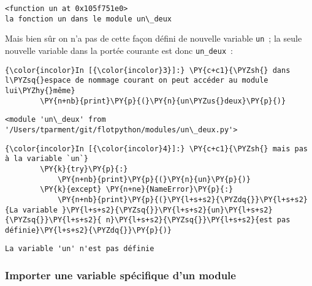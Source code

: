     \begin{Verbatim}[commandchars=\\\{\},frame=single,framerule=0.3mm,rulecolor=\color{cellframecolor}]
<function un at 0x105f751e0>
la fonction un dans le module un\_deux
\end{Verbatim}

    Mais bien sûr on n'a pas de cette façon défini de nouvelle variable
\texttt{un}~; la seule nouvelle variable dans la portée courante est
donc \texttt{un\_deux}~:

    \begin{Verbatim}[commandchars=\\\{\},frame=single,framerule=0.3mm,rulecolor=\color{cellframecolor}]
{\color{incolor}In [{\color{incolor}3}]:} \PY{c+c1}{\PYZsh{} dans l\PYZsq{}espace de nommage courant on peut accéder au module lui\PYZhy{}même}
        \PY{n+nb}{print}\PY{p}{(}\PY{n}{un\PYZus{}deux}\PY{p}{)}
\end{Verbatim}


    \begin{Verbatim}[commandchars=\\\{\},frame=single,framerule=0.3mm,rulecolor=\color{cellframecolor}]
<module 'un\_deux' from '/Users/tparment/git/flotpython/modules/un\_deux.py'>
\end{Verbatim}

    \begin{Verbatim}[commandchars=\\\{\},frame=single,framerule=0.3mm,rulecolor=\color{cellframecolor}]
{\color{incolor}In [{\color{incolor}4}]:} \PY{c+c1}{\PYZsh{} mais pas à la variable `un`}
        \PY{k}{try}\PY{p}{:}
            \PY{n+nb}{print}\PY{p}{(}\PY{n}{un}\PY{p}{)}
        \PY{k}{except} \PY{n+ne}{NameError}\PY{p}{:} 
            \PY{n+nb}{print}\PY{p}{(}\PY{l+s+s2}{\PYZdq{}}\PY{l+s+s2}{La variable }\PY{l+s+s2}{\PYZsq{}}\PY{l+s+s2}{un}\PY{l+s+s2}{\PYZsq{}}\PY{l+s+s2}{ n}\PY{l+s+s2}{\PYZsq{}}\PY{l+s+s2}{est pas définie}\PY{l+s+s2}{\PYZdq{}}\PY{p}{)}
\end{Verbatim}


    \begin{Verbatim}[commandchars=\\\{\},frame=single,framerule=0.3mm,rulecolor=\color{cellframecolor}]
La variable 'un' n'est pas définie
\end{Verbatim}

    \hypertarget{importer-une-variable-spuxe9cifique-dun-module}{%
\subsubsection{Importer une variable spécifique d'un
module}\label{importer-une-variable-spuxe9cifique-dun-module}}

